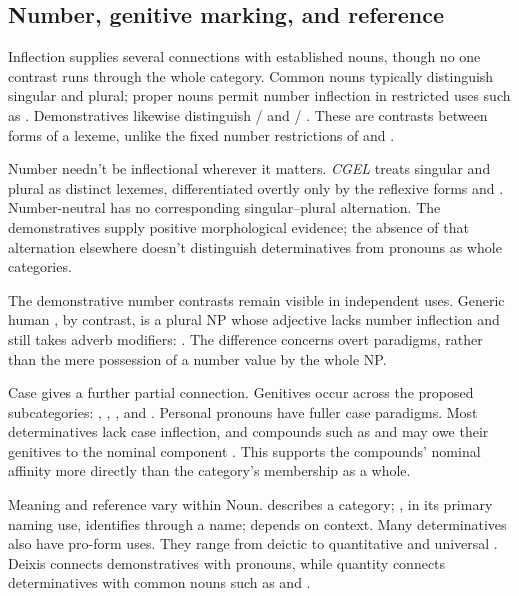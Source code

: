 \documentclass[12pt]{article}
\begin{document}
\subsection{Number, genitive marking, and reference}\label{sec:inflection}

Inflection supplies several connections with established nouns, though no one contrast runs through the whole category. Common nouns typically distinguish singular and plural; proper nouns permit number inflection in restricted uses such as . Demonstratives likewise distinguish / and / \citep[373, 521]{huddleston2002}. These are contrasts between forms of a lexeme, unlike the fixed number restrictions of  and .

Number needn't be inflectional wherever it matters. \textit{CGEL} treats singular and plural  as distinct lexemes, differentiated overtly only by the reflexive forms  and  \citep[486]{huddleston2002}. Number-neutral  has no corresponding singular--plural alternation. The demonstratives supply positive morphological evidence; the absence of that alternation elsewhere doesn't distinguish determinatives from pronouns as whole categories.

The demonstrative number contrasts remain visible in independent uses. Generic human , by contrast, is a plural NP whose adjective lacks number inflection and still takes adverb modifiers:  \citep[418]{huddleston2002}. The difference concerns overt paradigms, rather than the mere possession of a number value by the whole NP.

Case gives a further partial connection. Genitives occur across the proposed subcategories: , , , and . Personal pronouns have fuller case paradigms. Most determinatives lack case inflection, and compounds such as  and  may owe their genitives to the nominal component \citep[423--424, 479--480]{huddleston2002}. This supports the compounds' nominal affinity more directly than the category's membership as a whole.

Meaning and reference vary within Noun.  describes a category; , in its primary naming use, identifies through a name;  depends on context. Many determinatives also have pro-form uses. They range from deictic  to quantitative  and universal  \citep[358--360, 370--405, 425--428, 515--521]{huddleston2002}. Deixis connects demonstratives with pronouns, while quantity connects determinatives with common nouns such as  and .
\end{document}
